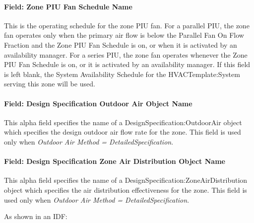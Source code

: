 \paragraph{Field: Zone PIU Fan Schedule Name}\label{field-zone-piu-fan-schedule-name}

This is the operating schedule for the zone PIU fan. For a parallel PIU, the zone fan operates only when the primary air flow is below the Parallel Fan On Flow Fraction and the Zone PIU Fan Schedule is on, or when it is activated by an availability manager. For a series PIU, the zone fan operates whenever the Zone PIU Fan Schedule is on, or it is activated by an availability manager. If this field is left blank, the System Availability Schedule for the HVACTemplate:System serving this zone will be used.

\paragraph{Field: Design Specification Outdoor Air Object Name}\label{field-design-specification-outdoor-air-object-name-8}

This alpha field specifies the name of a DesignSpecification:OutdoorAir object which specifies the design outdoor air flow rate for the zone. This field is used only when \emph{Outdoor Air Method = DetailedSpecification}.

\paragraph{Field: Design Specification Zone Air Distribution Object Name}\label{field-design-specification-zone-air-distribution-object-name-8}

This alpha field specifies the name of a DesignSpecification:ZoneAirDistribution object which specifies the air distribution effectiveness for the zone. This field is used only when \emph{Outdoor Air Method = DetailedSpecification}.

As shown in an IDF:

